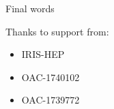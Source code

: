 \begin{frame}{Final words}

    \begin{block}{Thanks to support from:}
    \begin{itemize}
        \item IRIS-HEP
        \item OAC-1740102
        \item OAC-1739772
    \end{itemize}
    \end{block}
\end{frame}
